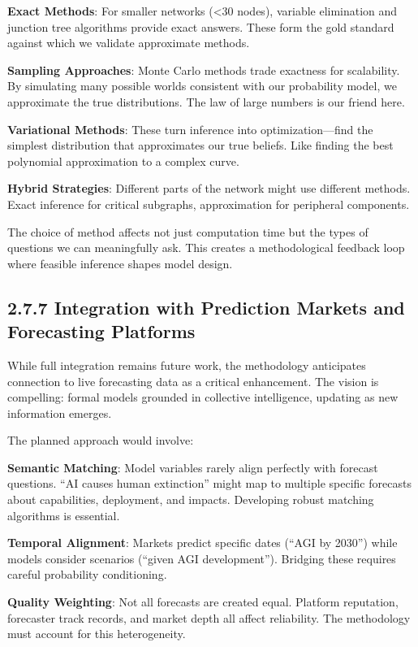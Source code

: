\documentclass[
  11pt,
  letterpaper,
]{book}
\begin{document}
\textbf{Exact Methods}: For smaller networks (\textless30 nodes),
variable elimination and junction tree algorithms provide exact answers.
These form the gold standard against which we validate approximate
methods.

\textbf{Sampling Approaches}: Monte Carlo methods trade exactness for
scalability. By simulating many possible worlds consistent with our
probability model, we approximate the true distributions. The law of
large numbers is our friend here.

\textbf{Variational Methods}: These turn inference into
optimization---find the simplest distribution that approximates our true
beliefs. Like finding the best polynomial approximation to a complex
curve.

\textbf{Hybrid Strategies}: Different parts of the network might use
different methods. Exact inference for critical subgraphs, approximation
for peripheral components.

The choice of method affects not just computation time but the types of
questions we can meaningfully ask. This creates a methodological
feedback loop where feasible inference shapes model design.

\subsection{2.7.7 Integration with Prediction Markets and Forecasting
Platforms}\label{sec-prediction-markets}

While full integration remains future work, the methodology anticipates
connection to live forecasting data as a critical enhancement. The
vision is compelling: formal models grounded in collective intelligence,
updating as new information emerges.

The planned approach would involve:

\textbf{Semantic Matching}: Model variables rarely align perfectly with
forecast questions. ``AI causes human extinction'' might map to multiple
specific forecasts about capabilities, deployment, and impacts.
Developing robust matching algorithms is essential.

\textbf{Temporal Alignment}: Markets predict specific dates (``AGI by
2030'') while models consider scenarios (``given AGI development'').
Bridging these requires careful probability conditioning.

\textbf{Quality Weighting}: Not all forecasts are created equal.
Platform reputation, forecaster track records, and market depth all
affect reliability. The methodology must account for this heterogeneity.
\end{document}

